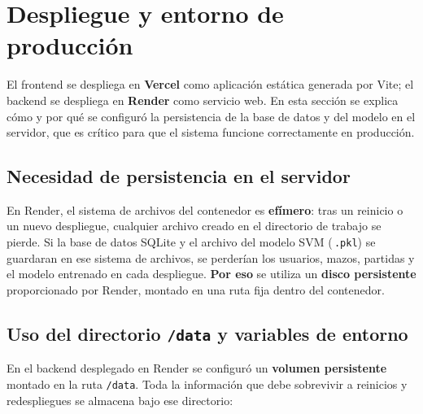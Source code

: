 \section{Despliegue y entorno de producción}

El frontend se despliega en \textbf{Vercel} como aplicación estática generada por Vite; el backend se despliega en \textbf{Render} como servicio web. En esta sección se explica cómo y por qué se configuró la persistencia de la base de datos y del modelo en el servidor, que es crítico para que el sistema funcione correctamente en producción.

\subsection{Necesidad de persistencia en el servidor}

En Render, el sistema de archivos del contenedor es \textbf{efímero}: tras un reinicio o un nuevo despliegue, cualquier archivo creado en el directorio de trabajo se pierde. Si la base de datos SQLite y el archivo del modelo SVM (\,\texttt{.pkl}) se guardaran en ese sistema de archivos, se perderían los usuarios, mazos, partidas y el modelo entrenado en cada despliegue. \textbf{Por eso} se utiliza un \textbf{disco persistente} proporcionado por Render, montado en una ruta fija dentro del contenedor.

\subsection{Uso del directorio \texttt{/data} y variables de entorno}

En el backend desplegado en Render se configuró un \textbf{volumen persistente} montado en la ruta \texttt{/data}. Toda la información que debe sobrevivir a reinicios y redespliegues se almacena bajo ese directorio:

